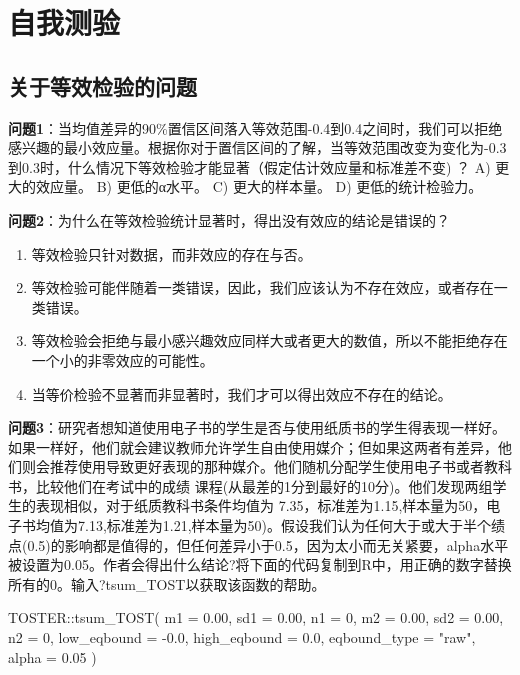 \documentclass[
  letterpaper,
  DIV=11,
  numbers=noendperiod]{scrreprt}
\newenvironment{Shaded}{\begin{snugshade}}{\end{snugshade}}
\newcommand{\AttributeTok}[1]{\textcolor[rgb]{0.40,0.45,0.13}{#1}}
\newcommand{\DecValTok}[1]{\textcolor[rgb]{0.68,0.00,0.00}{#1}}
\newcommand{\FloatTok}[1]{\textcolor[rgb]{0.68,0.00,0.00}{#1}}
\newcommand{\FunctionTok}[1]{\textcolor[rgb]{0.28,0.35,0.67}{#1}}
\newcommand{\NormalTok}[1]{\textcolor[rgb]{0.00,0.23,0.31}{#1}}
\newcommand{\SpecialCharTok}[1]{\textcolor[rgb]{0.37,0.37,0.37}{#1}}
\newcommand{\StringTok}[1]{\textcolor[rgb]{0.13,0.47,0.30}{#1}}
\providecommand{\tightlist}{%
  \setlength{\itemsep}{0pt}\setlength{\parskip}{0pt}}\usepackage{longtable,booktabs,array}
\begin{document}
\hypertarget{ux81eaux6211ux6d4bux9a8c}{%
\section{自我测验}\label{ux81eaux6211ux6d4bux9a8c}}

\hypertarget{ux5173ux4e8eux7b49ux6548ux68c0ux9a8cux7684ux95eeux9898}{%
\subsection{关于等效检验的问题}\label{ux5173ux4e8eux7b49ux6548ux68c0ux9a8cux7684ux95eeux9898}}

\textbf{问题1}：当均值差异的90\%置信区间落入等效范围-0.4到0.4之间时，我们可以拒绝感兴趣的最小效应量。根据你对于置信区间的了解，当等效范围改变为变化为-0.3到0.3时，什么情况下等效检验才能显著（假定估计效应量和标准差不变)
？ A) 更大的效应量。 B) 更低的α水平。 C) 更大的样本量。 D)
更低的统计检验力。

\textbf{问题2}：为什么在等效检验统计显著时，得出没有效应的结论是错误的？

\begin{enumerate}
\def\labelenumi{\Alph{enumi})}
\tightlist
\item
  等效检验只针对数据，而非效应的存在与否。
\item
  等效检验可能伴随着一类错误，因此，我们应该认为不存在效应，或者存在一类错误。
\item
  等效检验会拒绝与最小感兴趣效应同样大或者更大的数值，所以不能拒绝存在一个小的非零效应的可能性。
\item
  当等价检验不显著而非显著时，我们才可以得出效应不存在的结论。
\end{enumerate}

\textbf{问题3}：研究者想知道使用电子书的学生是否与使用纸质书的学生得表现一样好。如果一样好，他们就会建议教师允许学生自由使用媒介；但如果这两者有差异，他们则会推荐使用导致更好表现的那种媒介。他们随机分配学生使用电子书或者教科书，比较他们在考试中的成绩
课程(从最差的1分到最好的10分)。他们发现两组学生的表现相似，对于纸质教科书条件均值为
7.35，标准差为1.15,样本量为50，电子书均值为7.13,标准差为1.21,样本量为50)。假设我们认为任何大于或大于半个绩点(0.5)的影响都是值得的，但任何差异小于0.5，因为太小而无关紧要，alpha水平被设置为0.05。作者会得出什么结论?将下面的代码复制到R中，用正确的数字替换所有的0。输入?tsum\_TOST以获取该函数的帮助。

\begin{Shaded}
\begin{Highlighting}[]
\NormalTok{TOSTER}\SpecialCharTok{::}\FunctionTok{tsum\_TOST}\NormalTok{(}
  \AttributeTok{m1 =} \FloatTok{0.00}\NormalTok{,}
  \AttributeTok{sd1 =} \FloatTok{0.00}\NormalTok{,}
  \AttributeTok{n1 =} \DecValTok{0}\NormalTok{,}
  \AttributeTok{m2 =} \FloatTok{0.00}\NormalTok{,}
  \AttributeTok{sd2 =} \FloatTok{0.00}\NormalTok{,}
  \AttributeTok{n2 =} \DecValTok{0}\NormalTok{,}
  \AttributeTok{low\_eqbound =} \SpecialCharTok{{-}}\FloatTok{0.0}\NormalTok{,}
  \AttributeTok{high\_eqbound =} \FloatTok{0.0}\NormalTok{,}
  \AttributeTok{eqbound\_type =} \StringTok{"raw"}\NormalTok{,}
  \AttributeTok{alpha =} \FloatTok{0.05}
\NormalTok{)}
\end{Highlighting}
\end{Shaded}
\end{document}
